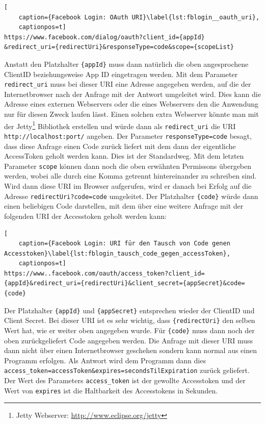 \begin{lstlisting}[
    caption={Facebook Login: OAuth URI}\label{lst:fblogin__oauth_uri},
    captionpos=t]
https://www.facebook.com/dialog/oauth?client_id={appId}   &redirect_uri={redirectUri}&responseType=code&scope={scopeList}
\end{lstlisting}

Anstatt den Platzhalter \texttt{\{appId\}} muss dann natürlich die oben angesprochene ClientID beziehungsweise App ID eingetragen werden. Mit dem Parameter \texttt{redirect\_uri} muss bei dieser URI eine Adresse angegeben werden, auf die der Internetbrowser nach der Anfrage mit der Antwort umgeleitet wird. Dies kann die Adresse eines externen Webservers oder die eines Webservers den die Anwendung nur für diesen Zweck laufen lässt. Einen solchen extra Webserver könnte man mit der Jetty\footnote{Jetty Webserver: \url{http://www.eclipse.org/jetty}} Bibliothek erstellen und würde dann als \texttt{redirect\_uri} die URI \texttt{http://localhost:{port}/} angeben. Der Parameter \texttt{responseType=code} besagt, dass diese Anfrage einen Code zurück liefert mit dem dann der eigentliche AccessToken geholt werden kann. Dies ist der Standardweg. Mit dem letzten Parameter \texttt{scope} können dann noch die oben erwähnten Permissons übergeben werden, wobei alle durch eine Komma getrennt hintereinander zu schreiben sind. Wird dann diese URI im Browser aufgerufen, wird er danach bei Erfolg auf die Adresse \texttt{{redirectUri}?code={code}} umgeleitet. Der Platzhalter \texttt{\{code\}} würde dann einen beliebigen Code darstellen, mit dem über eine weitere Anfrage mit der folgenden URI der Accesstoken geholt werden kann:

\begin{lstlisting}[
    caption={Facebook Login: URI für den Tausch von Code genen Accesstoken}\label{lst:fblogin_tausch_code_gegen_accessToken},
    captionpos=t]
https://www..facebook.com/oauth/access_token?client_id={appId}&redirect_uri={redirectUri}&client_secret={appSecret}&code={code}
\end{lstlisting}

Der Platzhalter \texttt{\{appId\}} und \texttt{\{appSecret\}} entsprechen wieder der ClientID und Client Secret. Bei dieser URI ist es sehr wichtig, dass \texttt{\{redirectUri\}} den selben Wert hat, wie er weiter oben angegeben wurde. Für \texttt{\{code\}} muss dann noch der oben zurückgeliefert Code angegeben werden. Die Anfrage mit dieser URI muss dann nicht über einen Internetbrowser geschehen sondern kann normal aus einen Programm erfolgen. Als Antwort wird dem Programm dann dies \texttt{access\_token={accessToken}\&expires={secondsTilExpiration}} zurück geliefert. Der Wert des Parameters \texttt{access\_token} ist der gewollte Accesstoken und der Wert von \texttt{expires} ist die Haltbarkeit des Accesstokens in Sekunden.

